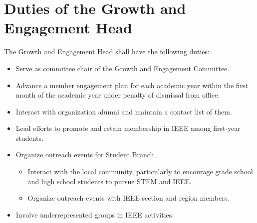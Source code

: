 \documentclass[12pt]{constitution}
\begin{document}
\section{Duties of the Growth and Engagement Head}
\label{sec:officer_growth}
The Growth and Engagement Head shall have the following duties:
\begin{itemize}
    \item Serve as committee chair of the Growth and Engagement Committee.
    \item Advance a member engagement plan for each academic year within the first month of the academic year under penalty of dismissal from office.
    \item Interact with organization alumni and maintain a contact list of them.
    \item Lead efforts to promote and retain membership in IEEE among first-year students.
    \item Organize outreach events for Student Branch.
    \begin{itemize}
        \item Interact with the local community, particularly to encourage grade school and high school students to pursue STEM and IEEE.
        \item Organize outreach events with IEEE section and region members.
    \end{itemize}    
    \item Involve underrepresented groups in IEEE activities.
\end{itemize}
\end{document}
